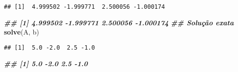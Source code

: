 \documentclass[
]{article}
\newenvironment{Shaded}{\begin{snugshade}}{\end{snugshade}}
\newcommand{\AttributeTok}[1]{\textcolor[rgb]{0.13,0.29,0.53}{#1}}
\newcommand{\DecValTok}[1]{\textcolor[rgb]{0.00,0.00,0.81}{#1}}
\newcommand{\DocumentationTok}[1]{\textcolor[rgb]{0.56,0.35,0.01}{\textbf{\textit{#1}}}}
\newcommand{\FloatTok}[1]{\textcolor[rgb]{0.00,0.00,0.81}{#1}}
\newcommand{\FunctionTok}[1]{\textcolor[rgb]{0.13,0.29,0.53}{\textbf{#1}}}
\newcommand{\NormalTok}[1]{#1}
\newcommand{\OtherTok}[1]{\textcolor[rgb]{0.56,0.35,0.01}{#1}}
\newcommand{\SpecialCharTok}[1]{\textcolor[rgb]{0.81,0.36,0.00}{\textbf{#1}}}
\begin{document}
\begin{Shaded}
\end{Shaded}

\begin{verbatim}
## [1]  4.999502 -1.999771  2.500056 -1.000174
\end{verbatim}

\begin{Shaded}
\begin{Highlighting}[]
\DocumentationTok{\#\# [1] 4.999502 {-}1.999771 2.500056 {-}1.000174}
\DocumentationTok{\#\# Solução exata}
\FunctionTok{solve}\NormalTok{(A, b)}
\end{Highlighting}
\end{Shaded}

\begin{verbatim}
## [1]  5.0 -2.0  2.5 -1.0
\end{verbatim}

\begin{Shaded}
\begin{Highlighting}[]
\DocumentationTok{\#\# [1] 5.0 {-}2.0 2.5 {-}1.0}
\end{Highlighting}
\end{Shaded}
\end{document}
